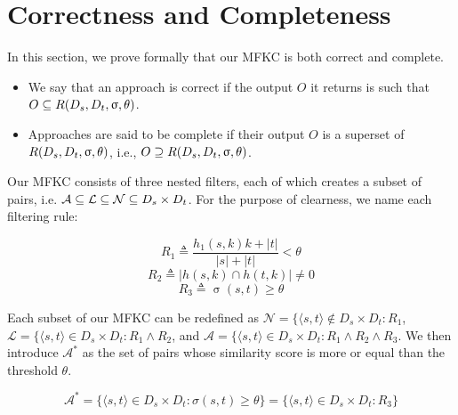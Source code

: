 \section{Correctness and Completeness}

In this section, we prove formally that our MFKC is both correct and complete.

\begin{itemize}
	\item We say that an approach is correct if the output $O$ it returns is such that $O \subseteq R({D_s}{},{D_t}{},\upsigma,\theta)$.
	\item Approaches are said to be complete if their output $O$ is a superset of $R({D_s}{},{D_t}{},\upsigma,\theta)$, i.e., $O \supseteq R({D_s}{},{D_t}{},\upsigma,\theta)$. 
\end{itemize}

Our MFKC consists of three nested filters, each of which creates a subset of pairs, i.e. $\mathcal{A} \subseteq \mathcal{L} \subseteq \mathcal{N} \subseteq {\ensuremath{D_s}}{} \times {\ensuremath{D_t}}{}$. For the purpose of clearness, we name each filtering rule:

\begin{equation*}
	R_1 \triangleq \frac{h_1(s,k) k + |t|}{|s| + |t|} < \theta
\end{equation*}
\begin{equation*}
	R_2 \triangleq |h(s,k) \cap h(t,k)| \neq 0
\end{equation*}
\begin{equation*}
	R_3 \triangleq \upsigma(s,t) \geq \theta
\end{equation*}

Each subset of our MFKC can be redefined as $\mathcal{N}=\{\langle s,t \rangle \notin D_s \times D_t : R_1$, $\mathcal{L}=\{\langle s,t \rangle \in D_s \times D_t : R_1 \wedge R_2$, and $\mathcal{A}=\{\langle s,t \rangle \in D_s \times D_t : R_1 \wedge R_2 \wedge R_3$. We then introduce $\mathcal{A}^*$ as the set of pairs whose similarity score is more or equal than the threshold $\theta$. 

\begin{equation} \label{eq:aa1}
	\mathcal{A}^*=\{\langle s,t \rangle \in D_s \times D_t : \sigma(s,t) \geq \theta \} = \{\langle s,t \rangle \in D_s \times D_t : R_3 \}
\end{equation}

